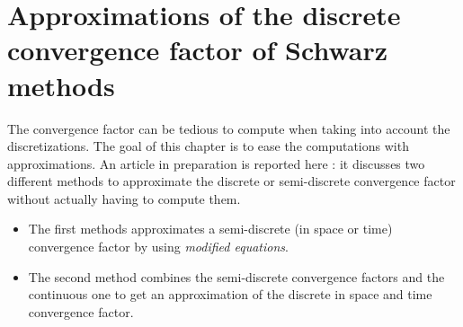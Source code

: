 \chapter{Approximations of the discrete convergence factor of Schwarz methods }
\label{ch:approximatedDiscreteSchwarz}
\minitoc
The convergence factor can be tedious to compute when taking
into account the discretizations. The goal of this chapter
is to ease the computations with approximations.
An article in preparation is reported here :
it discusses two different methods to approximate the discrete
or semi-discrete convergence factor without actually having to
compute them.
\begin{itemize}
\item The first methods approximates a semi-discrete
(in space or time) convergence factor by using
\textit{modified equations}.
\item The second method combines the semi-discrete convergence
factors and the continuous one to get an approximation of the
discrete in space and time convergence factor.
\end{itemize}
\setlength{\footskip}{110pt}







\setlength{\footskip}{30pt}

